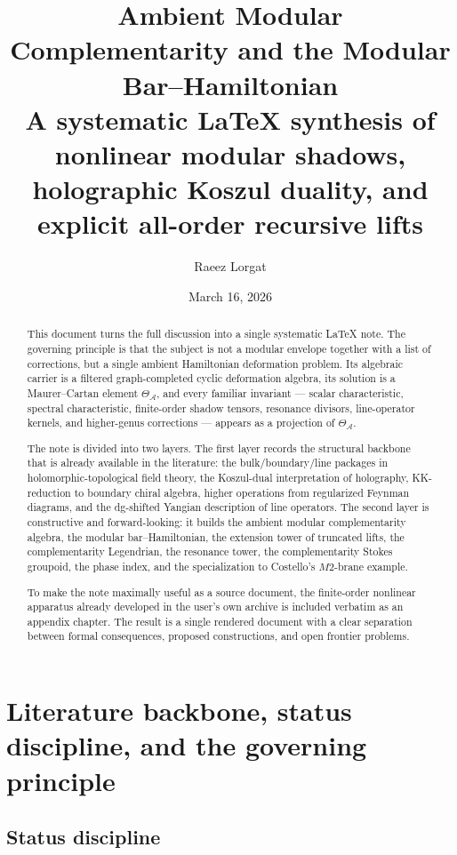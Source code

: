 \documentclass[11pt,oneside]{memoir}
\title{\textbf{Ambient Modular Complementarity and the Modular Bar--Hamiltonian}\\
\large A systematic \LaTeX{} synthesis of nonlinear modular shadows, holographic Koszul duality, and explicit all-order recursive lifts}
\author{Raeez Lorgat}
\date{March 16, 2026}
\numberwithin{equation}{chapter}
\theoremstyle{definition}
\newcommand{\cA}{\mathcal A}
\begin{document}
\frontmatter
\maketitle

\begin{abstract}
This document turns the full discussion into a single systematic \LaTeX{} note.  The governing principle is that the subject is not a modular envelope together with a list of corrections, but a single ambient Hamiltonian deformation problem.  Its algebraic carrier is a filtered graph-completed cyclic deformation algebra, its solution is a Maurer--Cartan element \(\Theta_{\cA}\), and every familiar invariant --- scalar characteristic, spectral characteristic, finite-order shadow tensors, resonance divisors, line-operator kernels, and higher-genus corrections --- appears as a projection of \(\Theta_{\cA}\).

The note is divided into two layers.  The first layer records the structural backbone that is already available in the literature: the bulk/boundary/line packages in holomorphic-topological field theory, the Koszul-dual interpretation of holography, KK-reduction to boundary chiral algebra, higher operations from regularized Feynman diagrams, and the dg-shifted Yangian description of line operators.  The second layer is constructive and forward-looking: it builds the ambient modular complementarity algebra, the modular bar--Hamiltonian, the extension tower of truncated lifts, the complementarity Legendrian, the resonance tower, the complementarity Stokes groupoid, the phase index, and the specialization to Costello's \(M2\)-brane example.

To make the note maximally useful as a source document, the finite-order nonlinear apparatus already developed in the user's own archive is included verbatim as an appendix chapter.  The result is a single rendered document with a clear separation between formal consequences, proposed constructions, and open frontier problems.
\end{abstract}

\clearpage
\tableofcontents

\mainmatter

\chapter{Literature backbone, status discipline, and the governing principle}
\label{chap:backbone-status}

\section{Status discipline}
\end{document}
